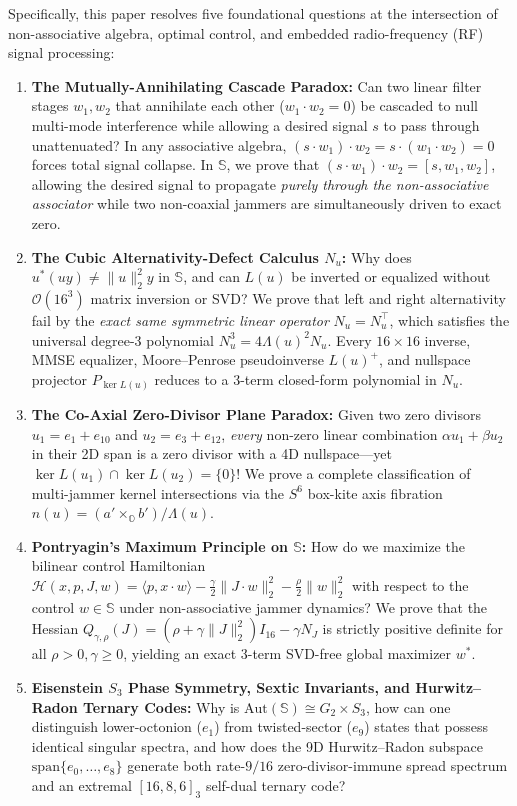 \documentclass[journal,twoside]{IEEEtran}
\theoremstyle{definition}
\theoremstyle{remark}
\newcommand{\Oc}{\mathbb{O}}
\newcommand{\Se}{\mathbb{S}}
\newcommand{\Aut}{\mathrm{Aut}}
\begin{document}
Specifically, this paper resolves five foundational questions at the intersection of non-associative algebra, optimal control, and embedded radio-frequency (RF) signal processing:
\begin{enumerate}
    \item \textbf{The Mutually-Annihilating Cascade Paradox:} Can two linear filter stages $w_1, w_2$ that annihilate each other ($w_1 \cdot w_2 = 0$) be cascaded to null multi-mode interference while allowing a desired signal $s$ to pass through unattenuated? In any associative algebra, $(s\cdot w_1)\cdot w_2 = s\cdot(w_1\cdot w_2) = 0$ forces total signal collapse. In $\Se$, we prove that $(s\cdot w_1)\cdot w_2 = [s, w_1, w_2]$, allowing the desired signal to propagate \emph{purely through the non-associative associator} while two non-coaxial jammers are simultaneously driven to exact zero.
    \item \textbf{The Cubic Alternativity-Defect Calculus $N_u$:} Why does $u^*(uy) \neq \|u\|_2^2 y$ in $\Se$, and can $L(u)$ be inverted or equalized without $\mathcal{O}(16^3)$ matrix inversion or SVD? We prove that left and right alternativity fail by the \emph{exact same symmetric linear operator} $N_u = N_u^\top$, which satisfies the universal degree-3 polynomial $N_u^3 = 4\Lambda(u)^2 N_u$. Every $16\times 16$ inverse, MMSE equalizer, Moore--Penrose pseudoinverse $L(u)^+$, and nullspace projector $P_{\ker L(u)}$ reduces to a 3-term closed-form polynomial in $N_u$.
    \item \textbf{The Co-Axial Zero-Divisor Plane Paradox:} Given two zero divisors $u_1 = e_1 + e_{10}$ and $u_2 = e_3 + e_{12}$, \emph{every} non-zero linear combination $\alpha u_1 + \beta u_2$ in their 2D span is a zero divisor with a 4D nullspace---yet $\ker L(u_1) \cap \ker L(u_2) = \{0\}$! We prove a complete classification of multi-jammer kernel intersections via the $S^6$ box-kite axis fibration $n(u) = (a'\times_{\Oc} b')/\Lambda(u)$.
    \item \textbf{Pontryagin's Maximum Principle on $\Se$:} How do we maximize the bilinear control Hamiltonian $\mathcal{H}(x, p, J, w) = \langle p, x\cdot w\rangle - \frac{\gamma}{2}\|J\cdot w\|_2^2 - \frac{\rho}{2}\|w\|_2^2$ with respect to the control $w \in \Se$ under non-associative jammer dynamics? We prove that the Hessian $Q_{\gamma,\rho}(J) = (\rho + \gamma\|J\|_2^2)I_{16} - \gamma N_J$ is strictly positive definite for all $\rho > 0, \gamma \ge 0$, yielding an exact 3-term SVD-free global maximizer $w^*$.
    \item \textbf{Eisenstein $S_3$ Phase Symmetry, Sextic Invariants, and Hurwitz--Radon Ternary Codes:} Why is $\Aut(\Se) \cong G_2 \times S_3$, how can one distinguish lower-octonion ($e_1$) from twisted-sector ($e_9$) states that possess identical singular spectra, and how does the 9D Hurwitz--Radon subspace $\mathrm{span}\{e_0,\dots,e_8\}$ generate both rate-$9/16$ zero-divisor-immune spread spectrum and an extremal $[16, 8, 6]_3$ self-dual ternary code?
\end{enumerate}
\end{document}
